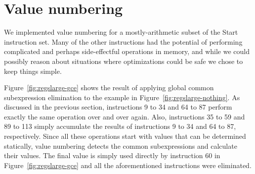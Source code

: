 \documentclass[10pt,twocolumn]{article}
\begin{document}
\section{Value numbering}

We implemented value numbering for a mostly-arithmetic subset of the
Start instruction set. Many of the other instructions had the
potential of performing complicated and perhaps side-effectful
operations in memory, and while we could possibly reason about
situations where optimizations could be safe we chose to keep things
simple.

Figure~\ref{fig:regslarge-gce} shows the result of applying global common
subexpression elimination to the example in Figure~\ref{fig:regslarge-nothing}.
As discussed in the previous section, instructions 9 to 34 and 64 to 87 perform exactly
the same operation over and over again. Also, instructions 35 to 59 and 89 to 113 simply
accumulate the results of instructions 9 to 34 and 64 to 87, respectively. Since all
these operations start with values that can be determined statically, value numbering
detects the common subexpressions and calculate their values. The final value is simply
used directly by instruction 60 in Figure~\ref{fig:regslarge-gce} and all the aforementioned
instructions were eliminated.
\end{document}
